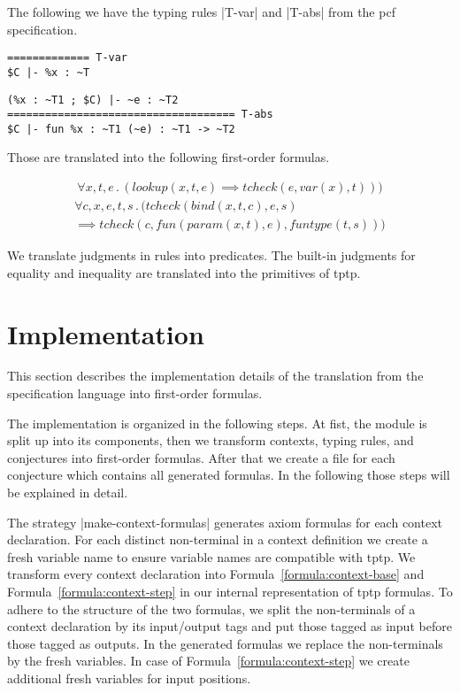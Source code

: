 \begin{example}
  The following we have the typing rules \code|T-var| and \code|T-abs|
  from the \gls{pcf} specification.

\begin{minipage}{.30\linewidth}
\begin{lstlisting}[language=sltc]
%x : ~T in $C
============= T-var
$C |- %x : ~T
\end{lstlisting}
\end{minipage}
\begin{minipage}{.64\linewidth}
\begin{lstlisting}[language=sltc]
(%x : ~T1 ; $C) |- ~e : ~T2
==================================== T-abs
$C |- fun %x : ~T1 (~e) : ~T1 -> ~T2
\end{lstlisting}
\end{minipage}

Those are translated into the following first-order formulas.

\begin{align}
  \forall x, t, e \,.\, (lookup(x, t, e) \implies tcheck(e, var(x), t)))
\end{align}
\begin{multline}
  \forall c, x, e, t, s \,.\, (tcheck(bind(x, t, c), e, s) \\ \implies
  tcheck(c, fun(param(x, t), e), funtype(t, s)))
\end{multline}
\end{example}

We translate judgments in rules into predicates. The built-in
judgments for equality and inequality are translated into the
primitives of \gls{tptp}.
\section{Implementation}
\label{sec:implementation-fof}
This section describes the implementation details of the translation
from the specification language into first-order formulas.

The implementation is organized in the following steps. At fist, the
module is split up into its components, then we transform contexts,
typing rules, and conjectures into first-order formulas. After that we
create a file for each conjecture which contains all generated
formulas. In the following those steps will be explained in detail.

The strategy \code|make-context-formulas| generates axiom formulas for
each context declaration. For each distinct non-terminal in a context
definition we create a fresh variable name to ensure variable names
are compatible with \gls{tptp}. We transform every context declaration
into Formula~\ref{formula:context-base} and
Formula~\ref{formula:context-step} in our internal representation of
\gls{tptp} formulas. To adhere to the structure of the two formulas,
we split the non-terminals of a context declaration by its
input/output tags and put those tagged as input before those tagged as
outputs. In the generated formulas we replace the non-terminals by the
fresh variables. In case of Formula~\ref{formula:context-step} we
create additional fresh variables for input positions.

